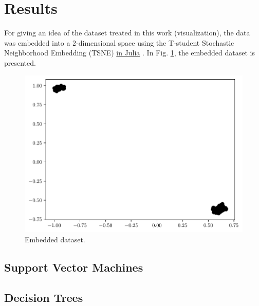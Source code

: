 \documentclass[conference]{IEEEtran}
\theoremstyle{definition}
\theoremstyle{remark}
\theoremstyle{remark}
\begin{document}
\section{Results}\label{sec:res}
For giving an idea of the dataset treated in this work (visualization), the data
was embedded into a 2-dimensional space using the T-student Stochastic
Neighborhood Embedding (TSNE) \href{https://github.com/lejon/TSne.jl}{in Julia}
\parencite{maaten2008}. In Fig. \ref{fig:emb_dat}, the embedded dataset is
presented.
\begin{figure}
  \includegraphics[width=\columnwidth]{figs/embedded-data.pdf}
  \caption{Embedded dataset.}
  \label{fig:emb_dat}
\end{figure}

\subsection{Support Vector Machines}


\subsection{Decision Trees}

\end{document}
